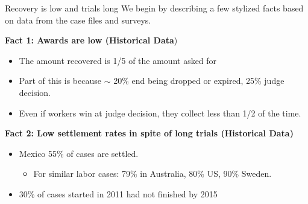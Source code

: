 \documentclass[9pt]{beamer}
\begin{document}
\begin{frame}{Recovery is low and trials long}
We begin by describing a few stylized facts based on data from the case files and surveys. 
\vspace{0.2in}

\textbf{Fact 1: Awards are low (Historical Data})
    \begin{itemize}
        \item  The amount recovered is 1/5 of the amount asked for
        \item Part of this is because $\sim$ 20\% end being dropped or expired, 25\% judge decision.
        \item Even if workers win at judge decision, they  collect less than 1/2 of the time.
            
    \end{itemize}
    
    \pause
    \vspace{.4in}
    \textbf{Fact 2: Low settlement rates in spite of long trials (Historical Data)}
    \vspace{.05in}
    \begin{itemize}
        \item Mexico 55\% of cases are settled. 
        \begin{itemize}
            \item For similar labor cases: 79\% in Australia, 80\% US, 90\% Sweden.
        \end{itemize}
        \vspace{.05in}
        \item 30\% of cases started in 2011 had not finished by 2015
    \end{itemize}

    
\end{frame}




\end{document}

